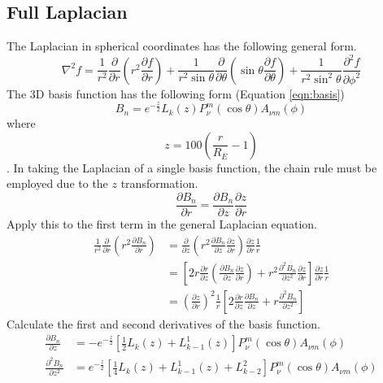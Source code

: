 \documentclass[12pt,letterpaper]{article}
\begin{document}
  \subsection{Full Laplacian}
  The Laplacian in spherical coordinates has the following general form.
  \begin{equation}
    \nabla^2 f = \frac{1}{r^2}\frac{\partial}{\partial r}\left(r^2\frac{\partial f}{\partial r}\right) + \frac{1}{r^2\sin\theta}\frac{\partial}{\partial\theta}\left(\sin\theta\frac{\partial f}{\partial\theta}\right) + \frac{1}{r^2\sin^2\theta}\frac{\partial^2 f}{\partial\phi^2}
  \end{equation}
  The 3D basis function has the following form (Equation \ref{eqn:basis})
  \begin{equation}
    B_n = e^{-\frac{z}{2}}L_k(z)P_\nu^m(\cos\theta)A_{\nu m}(\phi)
  \end{equation}
  where
  \begin{equation}
    z = 100\left(\frac{r}{R_E}-1\right)
  \end{equation}.
  In taking the Laplacian of a single basis function, the chain rule must be employed due to the \(z\) transformation.
  \begin{equation}
    \frac{\partial B_n}{\partial r} = \frac{\partial B_n}{\partial z}\frac{\partial z}{\partial r}
  \end{equation}
  Apply this to the first term in the general Laplacian equation.
  \begin{align}
    \frac{1}{r^2}\frac{\partial}{\partial r}\left(r^2 \frac{\partial B_n}{\partial r}\right) &= \frac{\partial}{\partial z}\left(r^2 \frac{\partial B_n}{\partial z}\frac{\partial z}{\partial r}\right) \frac{\partial z}{\partial r} \frac{1}{r} \\
    &= \left[2r\frac{\partial r}{\partial z}\left(\frac{\partial B_n}{\partial z}\frac{\partial z}{\partial r}\right) + r^2\frac{\partial^2 B_n}{\partial z^2}\frac{\partial z}{\partial r}\right]\frac{\partial z}{\partial r}\frac{1}{r} \\
    &= \left(\frac{\partial z}{\partial r}\right)^2\frac{1}{r}\left[2\frac{\partial r}{\partial z}\frac{\partial B_n}{\partial z} + r\frac{\partial^2 B_n}{\partial z^2}\right]
  \end{align}
  Calculate the first and second derivatives of the basis function.
  \begin{align}
    \frac{\partial B_n}{\partial z} &= -e^{-\frac{z}{2}}\left[\frac{1}{2}L_k(z)+L_{k-1}^1(z)\right]P_\nu^m(\cos\theta)A_{\nu m}(\phi) \\
    \frac{\partial^2 B_n}{\partial z^2} &= e^{-\frac{z}{2}}\left[\frac{1}{4}L_k(z)+L_{k-1}^1(z)+L_{k-2}^2\right]P_\nu^m(\cos\theta)A_{\nu m}(\phi)
  \end{align}
\end{document}
